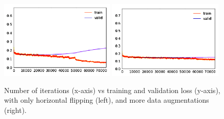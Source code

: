 \documentclass[12pt,oneside,a4paper]{report}
\begin{document}
\begin{figure}
  \centering
  \includegraphics[width=0.49\textwidth]{images/baseline_without_da}\hspace{0.01\textwidth}%
  \includegraphics[width=0.49\textwidth]{images/baseline_with_da}\\[0.01\textwidth]
  \caption{Number of iterations (x-axis) vs training and validation loss
    (y-axis), with only horizontal flipping (left), and more data augmentations
    (right).}
  \label{data_augmentation_loss}
\end{figure}
\end{document}
